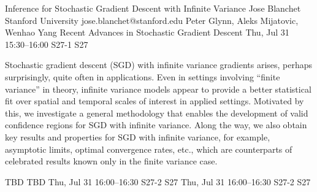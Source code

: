 \begin{talk}
  {Inference for Stochastic Gradient Descent with Infinite Variance}%
  {Jose Blanchet}%
  {Stanford University}%
  {jose.blanchet@stanford.edu}%
  {Peter Glynn, Aleks Mijatovic, Wenhao Yang}%
  {Recent Advances in Stochastic Gradient Descent}%
  {Thu, Jul 31 15:30–16:00}%
  {S27-1}%
  {S27}%
				
                
Stochastic gradient descent (SGD) with infinite variance gradients arises, perhaps surprisingly, quite often in applications. Even in settings involving “finite variance” in theory, infinite variance models appear to provide a better statistical fit over spatial and temporal scales of interest in applied settings. Motivated by this, we investigate a general methodology that enables the development of valid confidence regions for SGD with infinite variance. Along the way, we also obtain key results and properties for SGD with infinite variance, for example, asymptotic limits, optimal convergence rates, etc., which are counterparts of celebrated results known only in the finite variance case.


\medskip


\end{talk}

\begin{talk}
  {TBD}%
  {TBD}%
  {Thu, Jul 31 16:00–16:30}%
  {S27-2}%
  {S27}%
  {}%
  {Thu, Jul 31 16:00–16:30}%
  {S27-2}%
  {S27}%
\end{talk}

